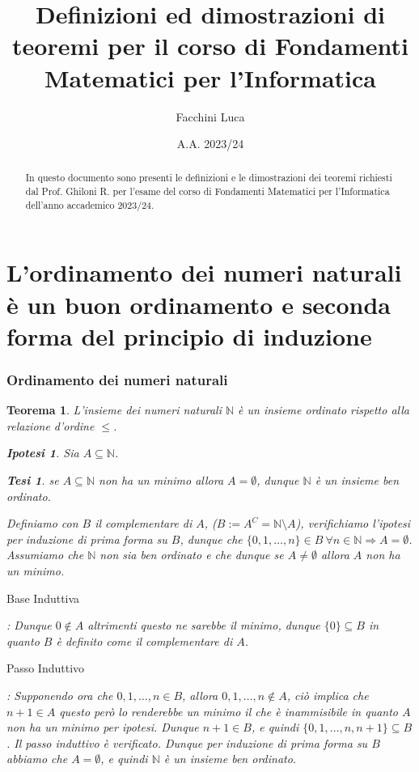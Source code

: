 \documentclass{article}
\title{Definizioni ed dimostrazioni di teoremi per il corso di Fondamenti Matematici per l'Informatica}
\author{Facchini Luca}
\date{A.A. 2023/24}
\makeatletter
\renewenvironment{proof}[1][\proofname]{\par
    \pushQED{\qed}%
    \normalfont \topsep6\p@\@plus6\p@\relax
    \trivlist
    \item\relax
    {\itshape
    #1\@addpunct{.}}\hspace\labelsep\ignorespaces
    }{%
    \popQED\endtrivlist\@endpefalse
}
\newtheorem{theorem}{Teorema}[part]
\newtheorem{ipothesis}[lemma]{Ipotesi}
\newtheorem{thesis}[lemma]{Tesi}
\makeatother
\begin{document}
\maketitle
\begin{abstract}
    In questo documento sono presenti le definizioni e le dimostrazioni dei teoremi richiesti dal Prof. Ghiloni R. per l'esame del corso di Fondamenti Matematici per l'Informatica dell'anno accademico 2023/24.
\end{abstract}
\tableofcontents
\pagebreak
\part[Ordinamento numeri naturali e seconda forma induzione]{L’ordinamento dei numeri naturali è un buon ordinamento e seconda forma del principio di induzione}
\section{Ordinamento dei numeri naturali}
\begin{theorem}
    L'insieme dei numeri naturali $\mathbb{N}$ è un insieme ordinato rispetto alla relazione d'ordine $\leq$.
    \begin{ipothesis}
        Sia \(A \subseteq \mathbb{N}\).
    \end{ipothesis}
    \begin{thesis}
        se \(A \subseteq \mathbb{N}\) non ha un minimo allora \(A=\emptyset\), dunque \(\mathbb{N}\) è un insieme ben ordinato.
    \end{thesis}
    \begin{proof}
        Definiamo con \(B\) il complementare di \(A\), (\(B:=A^C=\mathbb{N}\setminus A\)), verifichiamo l'ipotesi per induzione di prima forma su \(B\), dunque che \(\{0,1,\ldots,n\}\in B\ \forall n\in\mathbb{N}\Rightarrow A = \emptyset\).
        Assumiamo che \(\mathbb{N}\) non sia ben ordinato e che dunque se \(A\neq\emptyset\) allora \(A\) non ha un minimo.
        \subparagraph{Base Induttiva}: Dunque \(0\notin A\) altrimenti questo ne sarebbe il minimo, dunque \(\{0\}\subseteq B\) in quanto \(B\) è definito come il complementare di \(A\).\checkmark
        \subparagraph{Passo Induttivo}: Supponendo ora che \(0,1,\ldots,n\in B\), allora \(0,1,\ldots,n\notin A\), ciò implica che \(n+1\in A\) questo però lo renderebbe un minimo il che è inammisibile in quanto \(A\) non ha un minimo per ipotesi. Dunque \(n+1\in B\), e quindi \(\{0,1,\ldots,n,n+1\}\subseteq B\). Il passo induttivo è verificato.\checkmark
        Dunque per induzione di prima forma su \(B\) abbiamo che \(A=\emptyset\), e quindi \(\mathbb{N}\) è un insieme ben ordinato.
    \end{proof}
\end{theorem}
\end{document}
